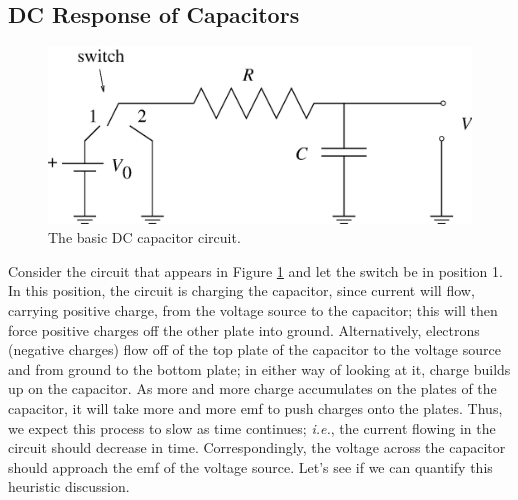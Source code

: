 \subsection{DC Response of Capacitors}

\begin{figure}[htb]
\centering 
\epsfxsize=10cm \includegraphics[scale=0.5]{5_rccircuits/rc1.eps}
\caption{The basic DC capacitor circuit.}
\label{fig:RC:cap1}
\end{figure}

Consider the circuit that appears in Figure \ref{fig:RC:cap1} and let the 
switch be in position 1. In this position, the circuit is charging the 
capacitor, since current will flow, carrying positive charge, from the voltage 
source to the capacitor; this will then force positive charges off the other 
plate into ground. Alternatively, electrons (negative charges) flow off of the
top plate of the capacitor to the voltage source and from ground to the bottom
plate; in either way of looking at it, charge builds up on the capacitor. As 
more and more charge accumulates on the plates of the capacitor, it will take 
more and more emf to push charges onto the plates. Thus, we expect this 
process to slow as time continues; {\it i.e.}, the current flowing in the 
circuit should decrease in time. Correspondingly, the voltage across the 
capacitor should approach the emf of the voltage source. Let's see if we can 
quantify this heuristic discussion.

